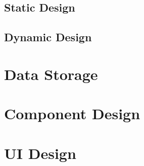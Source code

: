 \documentclass[11pt,letterpaper]{article}
\begin{document}
\subsection{Static Design}

\subsection{Dynamic Design}

\section{Data Storage}


\section{Component Design}



\section{UI Design}



\clearpage
\nocite{*}
\printbibliography[title={References}]
\end{document}
